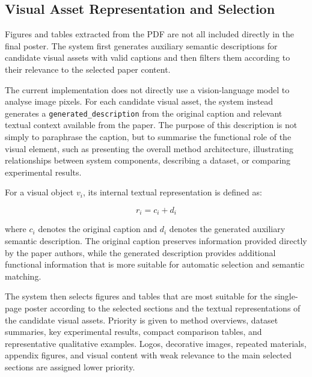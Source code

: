 \documentclass[12pt,oneside]{report}
\begin{document}
\subsection{Visual Asset Representation and Selection}

Figures and tables extracted from the PDF are not all included directly in the final poster. The system first generates auxiliary semantic descriptions for candidate visual assets with valid captions and then filters them according to their relevance to the selected paper content.

\vspace{1em}

The current implementation does not directly use a vision-language model to analyse image pixels. For each candidate visual asset, the system instead generates a \texttt{generated\_description} from the original caption and relevant textual context available from the paper. The purpose of this description is not simply to paraphrase the caption, but to summarise the functional role of the visual element, such as presenting the overall method architecture, illustrating relationships between system components, describing a dataset, or comparing experimental results.

\vspace{1em}

For a visual object \(v_i\), its internal textual representation is defined as:

$$
r_i = c_i + d_i
$$

where \(c_i\) denotes the original caption and \(d_i\) denotes the generated auxiliary semantic description. The original caption preserves information provided directly by the paper authors, while the generated description provides additional functional information that is more suitable for automatic selection and semantic matching.

\vspace{1em}

The system then selects figures and tables that are most suitable for the single-page poster according to the selected sections and the textual representations of the candidate visual assets. Priority is given to method overviews, dataset summaries, key experimental results, compact comparison tables, and representative qualitative examples. Logos, decorative images, repeated materials, appendix figures, and visual content with weak relevance to the main selected sections are assigned lower priority.

\vspace{1em}
\end{document}
